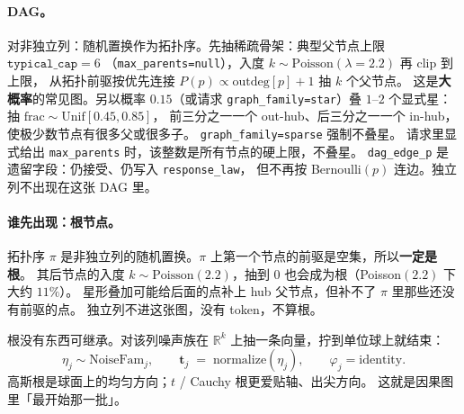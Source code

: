 \documentclass[11pt,a4paper,fontset=none]{ctexart}
\begin{document}
\paragraph{DAG。}
对非独立列：随机置换作为拓扑序。先抽稀疏骨架：典型父节点上限 $\texttt{typical\_cap}=6$
（\texttt{max\_parents=null}），入度 $k\sim\mathrm{Poisson}(\lambda=2.2)$ 再 clip 到上限，
从拓扑前驱按优先连接 $P(p)\propto \mathrm{outdeg}[p]+1$ 抽 $k$ 个父节点。
这是\textbf{大概率}的常见图。另以概率 $0.15$（或请求 \texttt{graph\_family=star}）叠 $1$--$2$ 个显式星：
抽 $\mathrm{frac}\sim\mathrm{Unif}[0.45,0.85]$，
前三分之一一个 out-hub、后三分之一一个 in-hub，使极少数节点有很多父或很多子。
\texttt{graph\_family=sparse} 强制不叠星。
请求里显式给出 \texttt{max\_parents} 时，该整数是所有节点的硬上限，不叠星。
\texttt{dag\_edge\_p} 是遗留字段：仍接受、仍写入 \texttt{response\_law}，
但不再按 Bernoulli$(p)$ 连边。独立列不出现在这张 DAG 里。

\paragraph{谁先出现：根节点。}
拓扑序 $\pi$ 是非独立列的随机置换。$\pi$ 上第一个节点的前驱是空集，所以\textbf{一定是根}。
其后节点的入度 $k\sim\mathrm{Poisson}(2.2)$，抽到 $0$ 也会成为根（Poisson$(2.2)$ 下大约 $11\%$）。
星形叠加可能给后面的点补上 hub 父节点，但补不了 $\pi$ 里那些还没有前驱的点。
独立列不进这张图，没有 token，不算根。

根没有东西可继承。对该列噪声族在 $\mathbb{R}^k$ 上抽一条向量，拧到单位球上就结束：
\begin{equation}
  \eta_j \sim \mathrm{NoiseFam}_j,\qquad
  \mathbf{t}_j \;=\; \mathrm{normalize}(\eta_j),\qquad
  \varphi_j=\mathrm{identity}.
\end{equation}
高斯根是球面上的均匀方向；$t$ / Cauchy 根更爱贴轴、出尖方向。
这就是因果图里「最开始那一批」。
\end{document}
